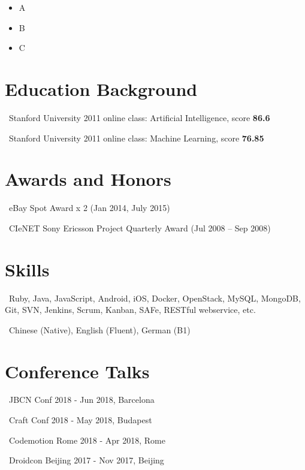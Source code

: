 \documentclass{cv}
\begin{document}
\begin{itemize}
  \setlength\itemsep{0em}
  \item A
  \item B
  \item C
\end{itemize}

\section*{Education Background}


\faGraduationCap\ Stanford University 2011 online class: Artificial Intelligence, score \textbf{86.6}

\faGraduationCap\ Stanford University 2011 online class: Machine Learning, score \textbf{76.85}
~\\

\section*{Awards and Honors}

\faTrophy\ eBay Spot Award x 2 (Jan 2014, July 2015)

\faTrophy\ CIeNET Sony Ericsson Project Quarterly Award (Jul 2008 – Sep 2008)
~\\

\section*{Skills}

\faCode\ Ruby, Java, JavaScript, Android, iOS, Docker, OpenStack, MySQL, MongoDB, Git, SVN, Jenkins, Scrum, Kanban, SAFe, RESTful webservice, etc.

\faLanguage\ Chinese (Native), English (Fluent), German (B1)
~\\

\section*{Conference Talks}

\faMicrophone\ JBCN Conf 2018 - Jun 2018, Barcelona

\faMicrophone\ Craft Conf 2018 - May 2018, Budapest

\faMicrophone\ Codemotion Rome 2018 - Apr 2018, Rome

\faMicrophone\ Droidcon Beijing 2017 - Nov 2017, Beijing
\end{document}
